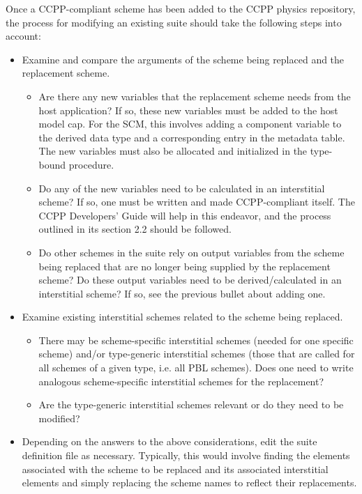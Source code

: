 Once a CCPP-compliant scheme has been added to the CCPP physics repository, the process for modifying an existing suite should take the following steps into account:

\begin{itemize}
\item Examine and compare the arguments of the scheme being replaced and the replacement scheme.
\begin{itemize}
\item Are there any new variables that the replacement scheme needs from the host application? If so, these new variables must be added to the host model cap. For the SCM, this involves adding a component variable to the  derived data type and a corresponding entry in the metadata table. The new variables must also be allocated and initialized in the  type-bound procedure.
\item Do any of the new variables need to be calculated in an interstitial scheme? If so, one must be written and made CCPP-compliant itself. The CCPP Developers' Guide will help in this endeavor, and the process outlined in its section 2.2 should be followed.
\item Do other schemes in the suite rely on output variables from the scheme being replaced that are no longer being supplied by the replacement scheme? Do these output variables need to be derived/calculated in an interstitial scheme? If so, see the previous bullet about adding one.
\end{itemize}
\item Examine existing interstitial schemes related to the scheme being replaced.
\begin{itemize}
\item There may be scheme-specific interstitial schemes (needed for one specific scheme) and/or type-generic interstitial schemes (those that are called for all schemes of a given type, i.e. all PBL schemes). Does one need to write analogous scheme-specific interstitial schemes for the replacement?
\item Are the type-generic interstitial schemes relevant or do they need to be modified?
\end{itemize}
\item Depending on the answers to the above considerations, edit the suite definition file as necessary. Typically, this would involve finding the  elements associated with the scheme to be replaced and its associated interstitial  elements and simply replacing the scheme names to reflect their replacements.
\end{itemize}


